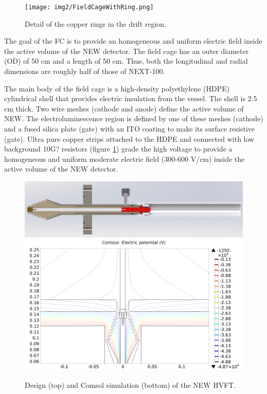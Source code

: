 \begin{figure}[hpt!]
\centering
\texttt{[image: img2/FieldCageWithRing.png]}
\caption{Detail of the copper rings in the drift region.} \label{fig:drift1}
\end{figure}

The goal of the FC is to provide an homogeneous and uniform electric field inside the active volume of the NEW detector. The field cage has an outer diameter (OD) of 50 cm and a length of 50 cm. Thus, both the longitudinal and radial dimensions are roughly half of those of NEXT-100. 

The main body of the field cage is a high-density polyethylene (HDPE) cylindrical shell that provides electric insulation from the vessel. The shell is 2.5 cm thick. Two wire meshes (cathode and anode) define the active volume of NEW. The electroluminescence region is defined by one of these meshes (cathode) and a fused silica plate (gate) with an ITO coating to make its surface resistive (gate). Ultra pure copper strips attached to the HDPE and connected with low background 10G? resistors (figure \ref{fig:drift1}) grade the high voltage to provide a homogeneous and uniform moderate electric field (300-600 V/cm) inside the active volume of the NEW detector.


\begin{figure}[hpt!]
\centering
\includegraphics[width=\textwidth]{img2/HVFT_full_image.png}
\includegraphics[width=\textwidth]{img2/HVFT_with_drift.png}
\caption{Design (top) and Comsol simulation (bottom) of the NEW HVFT.} \label{fig:hvft1}
\end{figure}


